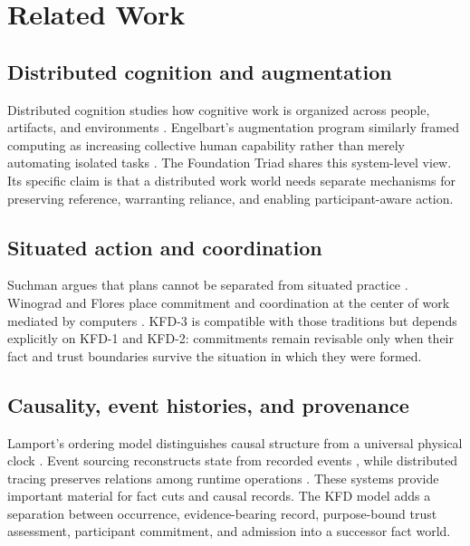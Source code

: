 \section{Related Work}
\label{sec:related}

\subsection{Distributed cognition and augmentation}

Distributed cognition studies how cognitive work is organized across people,
artifacts, and environments \cite{hutchins1995cognition}. Engelbart's
augmentation program similarly framed computing as increasing collective
human capability rather than merely automating isolated tasks
\cite{engelbart1962augmenting}. The Foundation Triad shares this system-level
view. Its specific claim is that a distributed work world needs separate
mechanisms for preserving reference, warranting reliance, and enabling
participant-aware action.

\subsection{Situated action and coordination}

Suchman argues that plans cannot be separated from situated practice
\cite{suchman1987plans}. Winograd and Flores place commitment and coordination
at the center of work mediated by computers
\cite{winograd1986understanding}. KFD-3 is compatible with those traditions but
depends explicitly on KFD-1 and KFD-2: commitments remain revisable only when
their fact and trust boundaries survive the situation in which they were
formed.

\subsection{Causality, event histories, and provenance}

Lamport's ordering model distinguishes causal structure from a universal
physical clock \cite{lamport1978time}. Event sourcing reconstructs state from
recorded events \cite{fowler2005eventsourcing}, while distributed tracing
preserves relations among runtime operations \cite{opentelemetry}. These
systems provide important material for fact cuts and causal records. The KFD
model adds a separation between occurrence, evidence-bearing record,
purpose-bound trust assessment, participant commitment, and admission into a
successor fact world.

